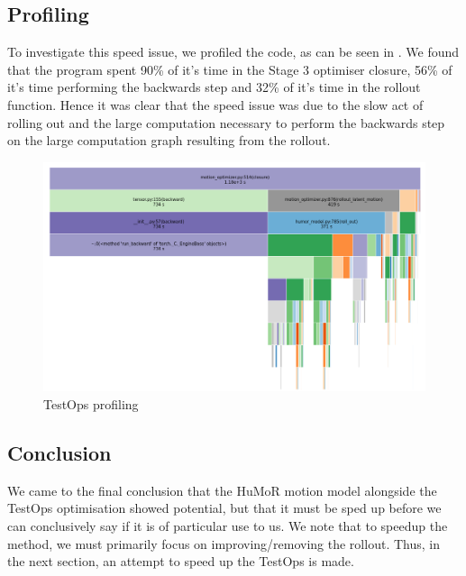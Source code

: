 \subsection{Profiling}
To investigate this speed issue, we profiled the code, as can be seen in . We found that the program spent 90\% of it's time in the Stage 3 optimiser closure, 56\% of it's time performing the backwards step and 32\% of it's time in the rollout function. Hence it was clear that the speed issue was due to the slow act of rolling out and the large computation necessary to perform the backwards step on the large computation graph resulting from the rollout.

\begin{figure}[h!]
    \centering
    \includegraphics[width=1\textwidth]{Figures/humor/profiling/profiling.png}
    \caption{TestOps profiling}
    \label{fig:humor_profiling}
\end{figure}

\subsection{Conclusion}
We came to the final conclusion that the HuMoR motion model alongside the TestOps optimisation showed potential, but that it must be sped up before we can conclusively say if it is of particular use to us. We note that to speedup the method, we must primarily focus on improving/removing the rollout. Thus, in the next section, an attempt to speed up the TestOps is made.
